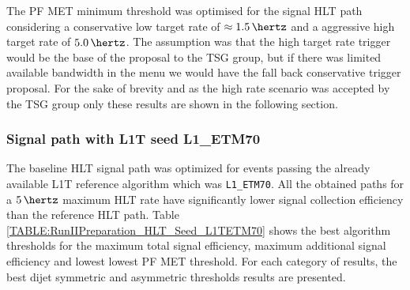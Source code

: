 The \gls{PF} \gls{MET} minimum threshold was optimised for the signal \gls{HLT} path considering a conservative low target rate of $\approx 1.5\,\hertz$ and a aggressive high target rate  of $5.0\,\hertz$. The assumption was that the high target rate trigger would be the base of the proposal to the \gls{TSG} group, but if there was limited available bandwidth in the menu we would have the fall back conservative trigger proposal. For the sake of brevity and as the high rate scenario was accepted by the \gls{TSG} group only these results are shown in the following section.

\subsubsection{Signal path with L1T seed L1\_ETM70}
\label{SECTION:RunIITriggerStudies_HLTAlgorithmDevelopment_L1ETM70}


The baseline \gls{HLT} signal path was optimized for events passing the already available \gls{L1T} reference algorithm which was \verb|L1_ETM70|. All the obtained paths for a $5\,\hertz$ maximum \gls{HLT} rate have significantly lower signal collection efficiency than the reference \gls{HLT} path. Table \ref{TABLE:RunIIPreparation_HLT_Seed_L1TETM70} shows the best algorithm thresholds for the maximum total signal efficiency, maximum additional signal efficiency and lowest lowest \gls{PF} \gls{MET} threshold. For each category of results, the best dijet symmetric and asymmetric \pt thresholds results are presented.

